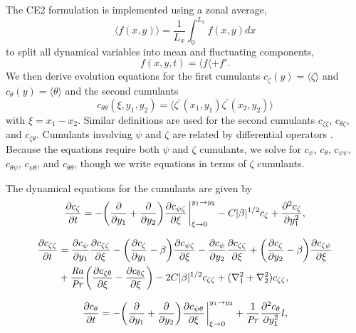 \documentclass{jfm}
\newcommand{\cz}{c_{\zeta}}
\newcommand{\cs}{c_{\psi}}
\newcommand{\ct}{c_{\theta}}
\newcommand{\css}{c_{\psi \psi}}
\newcommand{\csz}{c_{\psi \zeta}}
\newcommand{\czs}{c_{\zeta \psi}}
\newcommand{\czz}{c_{\zeta \zeta}}
\newcommand{\ctz}{c_{\theta \zeta}}
\newcommand{\czt}{c_{\zeta \theta}}
\newcommand{\ctt}{c_{\theta \theta}}
\newcommand{\cst}{c_{\psi \theta}}
\newcommand{\cts}{c_{\theta \psi}}
\newcommand{\Rayleigh}{\mbox{\textit{Ra}}}  %
\begin{document}
The CE2 formulation is implemented using a zonal average, 
\begin{equation}
\langle f(x,y) \rangle = \frac{1}{L_x} \int_0^{L_x} f(x,y) dx
\end{equation}
to split all dynamical variables into mean and fluctuating components,
\begin{equation}
    f(x,y,t) = \langle f \langle + f'.
\end{equation}
We then derive evolution equations for the first cumulants $\cz(y) = \langle \zeta \rangle $ and $\ct(y) = \langle \theta \rangle$ and the second cumulants 
\begin{equation}
    \ctt(\xi,y_1,y_2) = \langle \zeta^\prime(x_1,y_1) \zeta^\prime(x_2,y_2) \rangle
\end{equation}
with $\xi = x_1 - x_2$.
Similar definitions are used for the second cumulants $\czz$, $\ctz$, and $\czt$. 
Cumulants involving $\psi$ and $\zeta$ are related by differential operators \citep{2013PhRvL.110j4502T}.
Because the equations require both $\psi$ and $\zeta$ cumulants, we solve for $\cs$, $\ct$, $\css$, $\cts$, $\cst$, and $\ctt$, though we write equations in terms of $\zeta$ cumulants.

The  dynamical equations for the cumulants are given by
\begin{equation}
  \label{eq:cz}
  \pdv{\cz}{t} = - \qty(\pdv{y_1} + \pdv{y_2}) \pdv{\csz}{\xi}\eval_{\xi \to 0}^{y_1 \to y_2} - C |\beta|^{1/2} \cz + \pdv[2]{\cz}{y_1},
\end{equation}

\begin{equation}
  \label{eq:czz}
  \begin{split}
    \pdv{\czz}{t} &= \pdv{\cs}{y_1} \pdv{\czz}{\xi} - \qty(\pdv{\cz}{y_1} - \beta) \pdv{\csz}{\xi} - \pdv{\cs}{y_2} \pdv{\czz}{\xi}  + \qty(\pdv{\cz}{y_2} - \beta) \pdv{\czs}{\xi}\\
    &+ \frac{\Rayleigh}{\Pran} \qty(\pdv{\czt}{\xi} -  \pdv{\ctz}{\xi}) - 2C |\beta|^{1/2} \czz + (\nabla_1^2 + \nabla_2^2) \czz,    
  \end{split}
\end{equation}

\begin{equation}
  \label{eq:ct}
  \pdv{\ct}{t} = - \qty(\pdv{y_1} + \pdv{y_2}) \pdv{\cst}{\xi} \eval_{\xi \to 0}^{y_1 \to y_2} + \frac{1}{\Pran} \pdv[2]{\ct}{y_1}l,
\end{equation}
\end{document}
